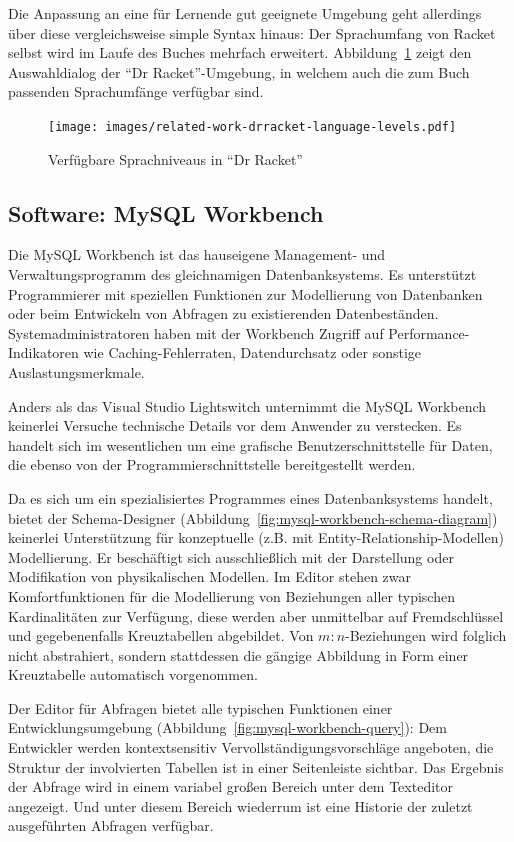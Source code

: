 Die Anpassung an eine für Lernende gut geeignete Umgebung geht allerdings über diese vergleichsweise simple Syntax hinaus: Der Sprachumfang von Racket selbst wird im Laufe des Buches mehrfach erweitert. Abbildung~\ref{fig:drracket-language-levels} zeigt den Auswahldialog der ``Dr Racket''-Umgebung, in welchem auch die zum Buch passenden Sprachumfänge verfügbar sind.

\begin{figure}[h]
  \centering \texttt{[image: images/related-work-drracket-language-levels.pdf]}
  \caption{Verfügbare Sprachniveaus in ``Dr Racket''}
  \label{fig:drracket-language-levels}
\end{figure}

\subsection{Software: MySQL Workbench}

Die MySQL Workbench ist das hauseigene Management- und Verwaltungsprogramm des gleichnamigen Datenbanksystems. Es unterstützt Programmierer mit speziellen Funktionen zur Modellierung von Datenbanken oder beim Entwickeln von Abfragen zu existierenden Datenbeständen. Systemadministratoren haben mit der Workbench Zugriff auf Performance-Indikatoren wie Caching-Fehlerraten, Datendurchsatz oder sonstige Auslastungsmerkmale.

Anders als das Visual Studio Lightswitch unternimmt die MySQL Workbench keinerlei Versuche technische Details vor dem Anwender zu verstecken. Es handelt sich im wesentlichen um eine grafische Benutzerschnittstelle für Daten, die ebenso von der Programmierschnittstelle bereitgestellt werden.

Da es sich um ein spezialisiertes Programmes eines Datenbanksystems handelt, bietet der Schema-Designer (Abbildung~\ref{fig:mysql-workbench-schema-diagram}) keinerlei Unterstützung für konzeptuelle (z.B. mit Entity-Relationship-Modellen) Modellierung. Er beschäftigt sich ausschließlich mit der Darstellung oder Modifikation von physikalischen Modellen. Im Editor stehen zwar Komfortfunktionen für die Modellierung von Beziehungen aller typischen Kardinalitäten zur Verfügung, diese werden aber unmittelbar auf Fremdschlüssel und gegebenenfalls Kreuztabellen abgebildet. Von $m:n$-Beziehungen wird folglich nicht abstrahiert, sondern stattdessen die gängige Abbildung in Form einer Kreuztabelle automatisch vorgenommen.

Der Editor für Abfragen bietet alle typischen Funktionen einer Entwicklungsumgebung (Abbildung~\ref{fig:mysql-workbench-query}): Dem Entwickler werden kontextsensitiv Vervollständigungsvorschläge angeboten, die Struktur der involvierten Tabellen ist in einer Seitenleiste sichtbar. Das Ergebnis der Abfrage wird in einem variabel großen Bereich unter dem Texteditor angezeigt. Und unter diesem Bereich wiederrum ist eine Historie der zuletzt ausgeführten Abfragen verfügbar.


